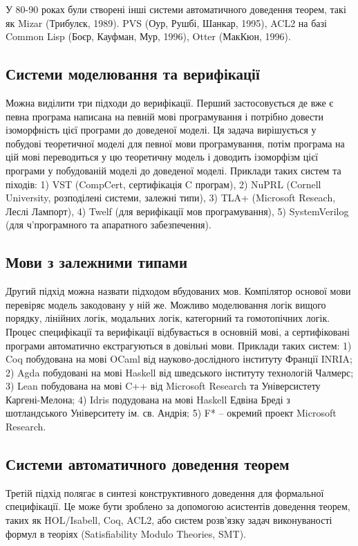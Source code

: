 \documentclass{article}
\begin{document}
У 80-90 роках були створені інші системи автоматичного доведення теорем,
такі як Mizar (Трибулєк, 1989). PVS (Оур, Рушбі, Шанкар, 1995),
ACL2 на базі Common Lisp (Боєр, Кауфман, Мур, 1996), Otter (МакКюн, 1996).

\subsection{Системи моделювання та верифікації}

Можна виділити три підходи до верифікації.
Перший застосовується де вже є
певна програма написана на певній мові програмування і потрібно довести ізоморфність
цієї програми до доведеної моделі. Ця задача вирішується у побудові теоретичної моделі
для певної мови програмування, потім програма на цій мові переводиться у цю
теоретичну модель і доводить ізоморфізм цієї програми у побудованій моделі до доведеної моделі.
Приклади таких систем та піходів: 1) VST (CompCert, сертифікація C програм),
2) NuPRL (Cornell University, розподілені системи, залежні типи),
3) TLA+ (Microsoft Reseach, Леслі Лампорт),
4) Twelf (для верифікації мов програмування), 5) SystemVerilog (для
ч'програмного та апаратного забезпечення).

\subsection{Мови з залежними типами}

Другий підхід можна назвати підходом вбудованих мов.
Компілятор основої мови перевіряє модель закодовану у ній же. Можливо моделювання
логік вищого порядку, лінійних логік, модальних логік, категорний та гомотопічних логік.
Процес специфікації та верифікації відбувається в основній мові, а сертифіковані програми
автоматично екстрагуються в довільні мови.
Приклади таких систем: 1) Coq побудована на мові OCaml від науково-дослідного
інституту Франції INRIA; 2) Agda побудовані на мові Haskell від шведського інституту технологій Чалмерс;
3) Lean побудована на мові C++ від Microsoft Research та Універсистету Каргені-Мелона;
4) Idris подудована на мові Haskell Едвіна Бреді з шотландського Університету ім. св. Андрія;
5) F* -- окремий проект Microsoft Research.

\subsection{Системи автоматичного доведення теорем}

Третій підхід полягає в синтезі конструктивного доведення
для формальної специфікації. Це може бути зроблено за
допомогою асистентів доведення теорем, таких як HOL/Isabell, Coq, ACL2,
або систем розв'язку задач виконуваності формул в теоріях (Satisfiability Modulo Theories, SMT).
\end{document}
